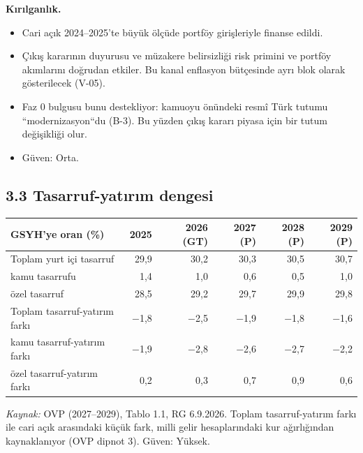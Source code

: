 \textbf{Kırılganlık.}

\begin{itemize}
\tightlist
\item
  Cari açık 2024--2025'te büyük ölçüde portföy girişleriyle finanse edildi.
\item
  Çıkış kararının duyurusu ve müzakere belirsizliği risk primini ve portföy akımlarını doğrudan etkiler. Bu kanal enflasyon bütçesinde ayrı blok olarak gösterilecek (V-05).
\item
  Faz 0 bulgusu bunu destekliyor: kamuoyu önündeki resmî Türk tutumu ``modernizasyon``du (B-3). Bu yüzden çıkış kararı piyasa için bir tutum değişikliği olur.
\item
  \etiketH{} Güven: Orta.
\end{itemize}

\hypertarget{01_teshis-33-tasarruf-yatux131rux131m-dengesi}{%
\subsection{3.3 Tasarruf-yatırım dengesi}\label{01_teshis-33-tasarruf-yatux131rux131m-dengesi}}

\begingroup\gbtablo\footnotesize

\begin{longtable}[]{@{}lrrrrr@{}}
\toprule\noalign{}
\textbf{GSYH'ye oran (\%)} & \textbf{2025} & \textbf{2026 (GT)} & \textbf{2027 (P)} & \textbf{2028 (P)} & \textbf{2029 (P)} \\
\midrule\noalign{}
\endhead
\bottomrule\noalign{}
\endlastfoot
Toplam yurt içi tasarruf & 29,9 & 30,2 & 30,3 & 30,5 & 30,7 \\
kamu tasarrufu & 1,4 & 1,0 & 0,6 & 0,5 & 1,0 \\
özel tasarruf & 28,5 & 29,2 & 29,7 & 29,9 & 29,8 \\
Toplam tasarruf-yatırım farkı & −1,8 & −2,5 & −1,9 & −1,8 & −1,6 \\
kamu tasarruf-yatırım farkı & −1,9 & −2,8 & −2,6 & −2,7 & −2,2 \\
özel tasarruf-yatırım farkı & 0,2 & 0,3 & 0,7 & 0,9 & 0,6 \\
\end{longtable}

\endgroup

\emph{Kaynak:} \etiketV{} OVP (2027--2029), Tablo 1.1, RG 6.9.2026. Toplam tasarruf-yatırım farkı ile cari açık arasındaki küçük fark, milli gelir hesaplarındaki kur ağırlığından kaynaklanıyor (OVP dipnot 3). Güven: Yüksek.

